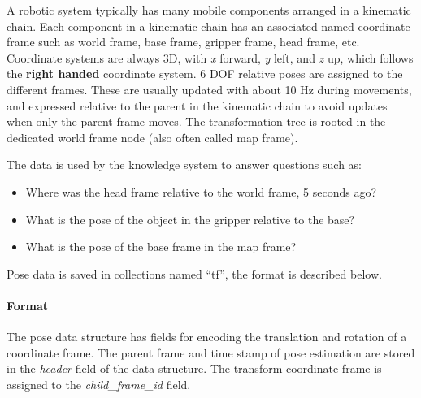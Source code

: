 
A robotic system typically has many mobile components arranged in a kinematic chain.
Each component in a kinematic chain has an associated named coordinate frame such as
world frame, base frame, gripper frame, head frame, etc.
Coordinate systems are always 3D, with \emph{x} forward, \emph{y} left, and \emph{z} up, which follows the \textbf{right handed} coordinate system.
6 DOF relative poses are assigned to the different frames.
These are usually updated with about 10 Hz during movements, and
expressed relative to the 
parent in the kinematic chain to avoid updates when only the parent frame moves.
The transformation tree is rooted in the dedicated world frame node
(also often called map frame).

The data is used by the \ease knowledge system to answer questions such as:
\begin{itemize}
 \item Where was the head frame relative to the world frame, 5 seconds ago?
 \item What is the pose of the object in the gripper relative to the base?
 \item What is the pose of the base frame in the map frame? 
\end{itemize}

Pose data is saved in \mongodb collections named ``tf'', the format is described below.

\paragraph{Format}
The pose data structure has
fields for encoding the translation and rotation of a coordinate frame.
The parent frame and time stamp of pose estimation
are stored in the \emph{header} field of the data structure.
The transform coordinate frame is assigned to the \emph{child\_frame\_id} field. \\


